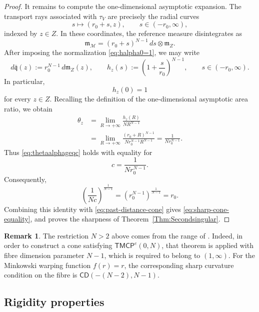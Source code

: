 \documentclass[a4paper,10pt]{article}
\newcommand{\CD}{\mathsf{CD}}
\newcommand{\TMCP}{\mathsf{TMCP}}
\newcommand{\mm}{\mathfrak m}
\newcommand{\qq}{\mathfrak q}
\theoremstyle{plain}
\theoremstyle{definition}
\newtheorem{remark}[lemma]{Remark}
\numberwithin{equation}{section}
\begin{document}
\begin{proof}
It remains to compute the one-dimensional asymptotic expansion.
The transport rays associated with $\tau_V$ are precisely the radial
curves
\[
    s\longmapsto (r_0+s,z),
    \qquad
    s\in(-r_0,\infty),
\]
indexed by $z\in Z$. In these coordinates, the reference measure
disintegrates as
\[
    \mm_{\mathcal M}
    =
    (r_0+s)^{N-1}\,ds\otimes\mm_Z.
\]
After imposing the normalization \eqref{eq:halpha0=1}, we may write
\[
    d\bar{\qq}(z)
    :=
    r_0^{N-1}\,d\mm_Z(z),
    \qquad
    h_z(s)
    :=
    \left(1+\frac{s}{r_0}\right)^{N-1},
    \qquad
    s\in(-r_0,\infty).
\]
In particular,
\[
    h_z(0)=1
\]
for every $z\in Z$. Recalling the definition of the
one-dimensional asymptotic area ratio, we obtain
\begin{align*}
    \theta_z
    &=
    \lim_{R\to+\infty}
    \frac{h_z(R)}{N R^{N-1}}\\
    &=
    \lim_{R\to+\infty}
    \frac{(r_0+R)^{N-1}}
         {N r_0^{N-1}R^{N-1}}
    =
    \frac{1}{N r_0^{N-1}}.
\end{align*}
Thus \eqref{eq:thetaalphageqc} holds with equality for
\[
    c=\frac{1}{N r_0^{N-1}}.
\]
Consequently,
\[
    \left(\frac{1}{Nc}\right)^{\frac{1}{N-1}}
    =
    \left(r_0^{N-1}\right)^{\frac{1}{N-1}}
    =
    r_0.
\]
Combining this identity with \eqref{eq:past-distance-cone} gives
\eqref{eq:sharp-cone-equality}, and proves the sharpness of
Theorem~\ref{Thm:Secondsingular}.
\end{proof}

\begin{remark}
The restriction $N>2$ above comes from the range of
\cite[Theorem~5.2]{CalistiKettererSaemann}. Indeed, in order to
construct a cone satisfying $\TMCP^e(0,N)$, that theorem is applied
with fibre dimension parameter $N-1$, which is required to belong to
$(1,\infty)$. For the Minkowski warping function $f(r)=r$, the
corresponding sharp curvature condition on the fibre is
\(
    \CD(-(N-2),N-1).
\)
\end{remark}

\subsection{Rigidity properties}
\end{document}
